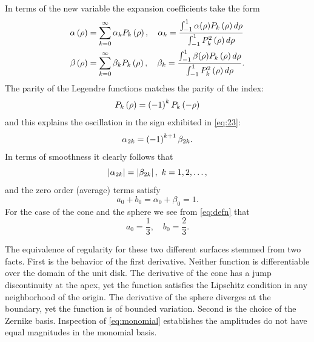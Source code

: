 \documentclass[preprint,12pt]{elsarticle}
\begin{document}
In terms of the new variable the expansion coefficients take the form
  \begin{equation}
    \begin{split}
    \alpha\paren{\rho} & = \sum_{k=0}^{\infty} \alpha_{k} P_{k}\paren{\rho}, 
     \quad \alpha_{k} = \frac{\int_{-1}^{1}\alpha(\rho) P_{k}\paren{\rho} d\rho}{\int_{-1}^{1} P_{k}^{2}\paren{\rho} d\rho} \\
%
    \beta\paren{\rho} & = \sum_{k=0}^{\infty} \beta_{k} P_{k}\paren{\rho}, 
     \quad \beta_{k} = \frac{\int_{-1}^{1}\beta(\rho) P_{k}\paren{\rho} d\rho}{\int_{-1}^{1} P_{k}^{2}\paren{\rho} d\rho}.
    \end{split}
    \label{eq:defn}
  \end{equation}
The parity of the Legendre functions matches the parity of the index:
\begin{equation}
  P_{k}\left( \rho \right) = \left( -1 \right)^{k} P_{k}\left( -\rho \right)
\end{equation}
and this explains the oscillation in the sign exhibited in \eqref{eq:23}:
\begin{equation}
  \alpha_{2k} = \left( -1 \right)^{k+1} \beta_{2k}.
  \label{eq:equals}
\end{equation}
In terms of smoothness it clearly follows that
\begin{equation}
  \left|\alpha_{2k}\right| = \left|\beta_{2k}\right|,\ k=1,2,\dots,
  \label{eq:canona}
\end{equation}
and the zero order (average) terms satisfy
\begin{equation}
  a_{0} + b_{0} = \alpha_{0} + \beta_{0} = 1.
  \label{eq:canonb}
\end{equation}
For the case of the cone and the sphere we see from \eqref{eq:defn} that 
\begin{equation}
  a_{0} = \frac{1}{3}, \quad
  b_{0} = \frac{2}{3}.
\end{equation}

The equivalence of regularity for these two different surfaces stemmed from two facts. First is the behavior of the first derivative. Neither function is differentiable over the domain of the unit disk. The derivative of the cone has a jump discontinuity at the apex, yet the function satisfies the Lipschitz condition in any neighborhood of the origin. The derivative of the sphere diverges at the boundary, yet the function is of bounded variation. Second is the choice of the Zernike basis. Inspection of \eqref{eq:monomial} establishes the amplitudes do not have equal magnitudes in the monomial basis. 
\end{document}

